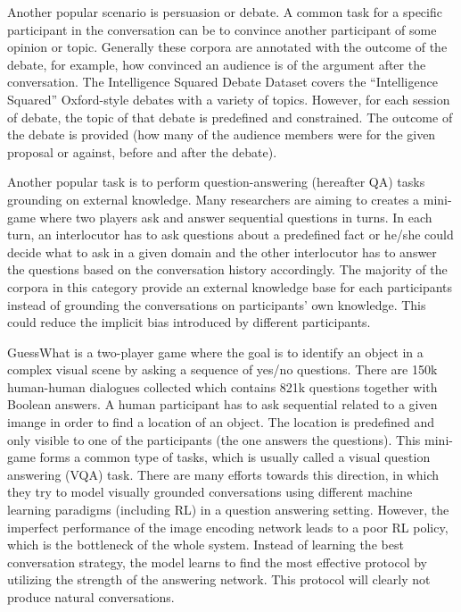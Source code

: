 \documentclass[bsc,frontabs,twoside,singlespacing,parskip,deptreport]{infthesis}     %
\begin{document}
Another popular scenario is persuasion or debate. A common task for a specific participant in the conversation can be to convince another participant of some opinion or topic. Generally these corpora are annotated with the outcome of the debate, for example, how convinced an audience is of the argument after the conversation. The Intelligence Squared Debate Dataset\cite{zhang2016conversational} covers the “Intelligence Squared” Oxford-style debates with a variety of topics. However, for each session of debate, the topic of that debate is predefined and constrained. The outcome of the debate is provided (how many of the audience members were for the given proposal or against, before and after the debate).

Another popular task is to perform question-answering (hereafter QA) tasks grounding on external knowledge. Many researchers are aiming to creates a mini-game where two players ask and answer sequential questions in turns. In each turn, an interlocutor has to ask questions about a predefined fact or he/she could decide what to ask in a given domain and the other interlocutor has to answer the questions based on the conversation history accordingly. The majority of the corpora in this category provide an external knowledge base for each participants instead of grounding the conversations on participants' own knowledge. This could reduce the implicit bias introduced by different participants.

GuessWhat\cite{de2017guesswhat} is a two-player game where the goal is to identify an object in a complex visual scene by asking a sequence of yes/no questions. There are 150k human-human dialogues collected which contains 821k questions together with Boolean answers. A human participant has to ask sequential related to a given imange in order to find a location of an object. The location is predefined and only visible to one of the participants (the one answers the questions). This mini-game forms a common type of tasks, which is usually called a visual question answering (VQA) task. There are many efforts towards this direction\cite{strub2017end,shekhar2017foil,reddy2019coqa,zhou2018dataset,de2017guesswhat,das2017visual,das2017learning}, in which they try to model visually grounded conversations using different machine learning paradigms (including RL) in a question answering setting. However, the imperfect performance of the image encoding network leads to a poor RL policy, which is the bottleneck of the whole system. Instead of learning the best conversation strategy, the model learns to find the most effective protocol by utilizing the strength of the answering network. This protocol will clearly not produce natural conversations.
\end{document}
